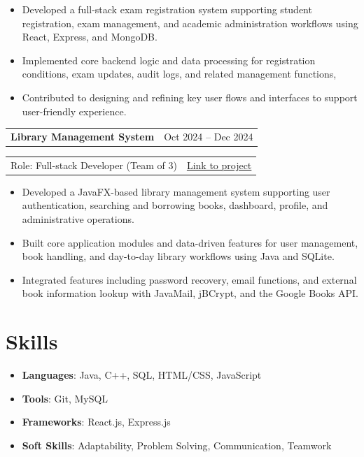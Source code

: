 \documentclass[a4paper,12pt]{article}
\begin{document}
\begin{itemize}[leftmargin=*, nosep]
    \item Developed a full-stack exam registration system supporting student registration, exam management, and academic administration workflows using React, Express, and MongoDB.
    \item Implemented core backend logic and data processing for registration conditions, exam updates, audit logs, and related management functions,
    \item Contributed to designing and refining key user flows and interfaces to support user-friendly experience.
\end{itemize}

\vspace{6pt}

\begin{tabularx}{\linewidth}{@{}X r@{}}
\textbf{Library Management System} & \normalsize{Oct 2024 -- Dec 2024} \\
\end{tabularx}
\begin{tabularx}{\linewidth}{@{}X r@{}}
Role: Full-stack Developer (Team of 3) & \href{https://github.com/tudzct/simpleLib}{Link to project} \\
\end{tabularx}

\begin{itemize}[leftmargin=*, nosep]
    \item Developed a JavaFX-based library management system supporting user authentication, searching and borrowing books, dashboard, profile, and administrative operations.
    \item Built core application modules and data-driven features for user management, book handling, and day-to-day library workflows using Java and SQLite.
    \item Integrated features including password recovery, email functions, and external book information lookup with JavaMail, jBCrypt, and the Google Books API.
\end{itemize}

\section{Skills}
\begin{itemize}[leftmargin=*, nosep]
    \item \textbf{Languages}: Java, C++, SQL, HTML/CSS, JavaScript
    \item \textbf{Tools}: Git, MySQL
    \item \textbf{Frameworks}: React.js, Express.js
    \item \textbf{Soft Skills}: Adaptability, Problem Solving, Communication, Teamwork
\end{itemize}
\end{document}
